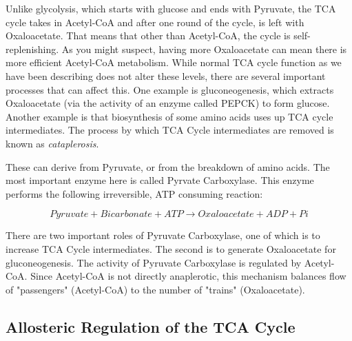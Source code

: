 \documentclass{tufte-handout}
\begin{document}
  Unlike glycolysis, which starts with glucose and ends with Pyruvate, the TCA cycle takes in Acetyl-CoA and after one round of the cycle, is left with Oxaloacetate.  That means that other than Acetyl-CoA, the cycle is self-replenishing.  As you might suspect, having more Oxaloacetate can mean there is more efficient Acetyl-CoA metabolism.  While normal TCA cycle function as we have been describing does not alter these levels, there are several important processes that can affect this.  One example is gluconeogenesis, which extracts Oxaloacetate (via the activity of an enzyme called PEPCK) to form glucose.  Another example is that biosynthesis of some amino acids uses up TCA cycle intermediates.  The process by which TCA Cycle intermediates are removed is known as \emph{cataplerosis}.

  These can derive from Pyruvate, or from the breakdown of amino acids.  The most important enzyme here is called Pyrvate Carboxylase.  This enzyme performs the following irreversible, ATP consuming reaction:

\begin{equation}\label{eq:pcx}
Pyruvate + Bicarbonate + ATP \rightarrow Oxaloacetate + ADP + Pi
\end{equation}

There are two important roles of Pyruvate Carboxylase, one of which is to increase TCA Cycle intermediates.  The second is to generate Oxaloacetate for gluconeogenesis.  The activity of Pyruvate Carboxylase is regulated by Acetyl-CoA.  Since Acetyl-CoA is not directly anaplerotic, this mechanism balances flow of "passengers" (Acetyl-CoA) to the number of "trains" (Oxaloacetate).  

\subsection{Allosteric Regulation of the TCA Cycle}





\end{document}
